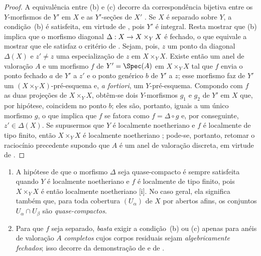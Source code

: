 \documentclass[oneside,10pt]{amsart}
\makeatletter
\newcommand{\ega@arrow}[2]{\mathchoice{#1}{#2}{#2}{#2}}
\renewcommand{\to}{\ega@arrow{\longrightarrow}{\rightarrow}}
\newcommand{\oldpage}[2][]{\marginnote{\normalfont\footnotesize\textbf{#1}~|~#2}\ignorespaces}
\let\EGAOriginalLabel\label
\renewcommand{\label}[1]{\phantomsection\EGAOriginalLabel{#1}}
\makeatother
\begin{document}
\begin{proof}
A equivalência entre (b) e (c) decorre da correspondência bijetiva entre os $Y$-morfismos de $Y'$ em $X$ e as $Y'$-seções de $X'$ .
Se $X$ é separado sobre $Y$, a condição~(b) é satisfeita, em virtude de , pois $Y'$ é integral.
Resta mostrar que (b) implica que o morfismo diagonal $\Delta:X\to X\times_Y X$ é fechado, o que equivale a mostrar que ele satisfaz o critério de .
Sejam, pois, $z$ um ponto da diagonal $\Delta(X)$ e $z'\neq z$ uma especialização de $z$ em $X\times_Y X$.
Existe então  um anel de valoração $A$ e um morfismo $f$ de $Y'=\Spec(A)$ em $X\times_Y X$ tal que $f$ envia o ponto fechado $a$ de $Y'$ a $z'$ e o ponto genérico $b$ de $Y'$ a $z$;
esse morfismo faz de $Y'$ um $(X\times_Y X)$-pré-esquema e, \emph{a fortiori}, um $Y$-pré-esquema.
Compondo com $f$ as duas projeções de $X\times_Y X$, obtêm-se dois $Y$-morfismos $g_1$ e $g_2$ de $Y'$ em $X$ que, por hipótese, coincidem no ponto $b$;
eles são, portanto, iguais a um único morfismo $g$, o que implica  que $f$ se fatora como $f=\Delta\circ g$ e, por conseguinte, $z'\in\Delta(X)$.
Se supusermos que $Y$ é localmente noetheriano e $f$ é localmente de tipo finito, então $X\times_Y X$ é localmente noetheriano ;
pode-se, portanto, retomar o raciocínio precedente supondo que $A$ é um anel de valoração discreta, em virtude de .
\end{proof}

\begin{remark}[7.2.4]
\label{II.7.2.4}
\begin{enumerate}
    \item[\rm{(i)}] A hipótese de que o morfismo $\Delta$ seja quase-compacto é sempre satisfeita quando $Y$ é localmente noetheriano e $f$ é localmente de tipo finito, pois $X\times_Y X$ é então localmente noetheriano [i].
        No caso geral, ela significa também que, para toda cobertura $(U_\alpha)$ de $X$ por abertos afins, os conjuntos $U_\alpha\cap U_\beta$ são \emph{quase-compactos}.
    \item[\rm{(ii)}] Para que $f$ seja separado, \emph{basta} exigir a condição~(b) ou (c) apenas para anéis de valoração $A$ \emph{completos} cujos corpos residuais sejam \emph{algebricamente fechados};
        isso decorre da demonstração de  e de .
\end{enumerate}
\end{remark}
\oldpage[II]{143}
\end{document}
